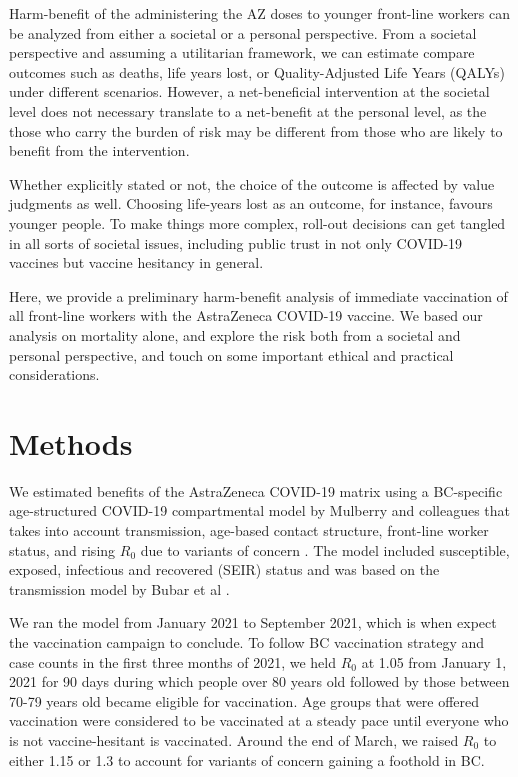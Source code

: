 \documentclass[]{interact}
\theoremstyle{plain}%
\theoremstyle{definition}
\theoremstyle{remark}
\begin{document}
Harm-benefit of the administering the AZ doses to younger front-line
workers can be analyzed from either a societal or a personal
perspective. From a societal perspective and assuming a utilitarian
framework, we can estimate compare outcomes such as deaths, life years
lost, or Quality-Adjusted Life Years (QALYs) under different scenarios.
However, a net-beneficial intervention at the societal level does not
necessary translate to a net-benefit at the personal level, as the those
who carry the burden of risk may be different from those who are likely
to benefit from the intervention.

Whether explicitly stated or not, the choice of the outcome is affected
by value judgments as well. Choosing life-years lost as an outcome, for
instance, favours younger people. To make things more complex, roll-out
decisions can get tangled in all sorts of societal issues, including
public trust in not only COVID-19 vaccines but vaccine hesitancy in
general.

Here, we provide a preliminary harm-benefit analysis of immediate
vaccination of all front-line workers with the AstraZeneca COVID-19
vaccine. We based our analysis on mortality alone, and explore the risk
both from a societal and personal perspective, and touch on some
important ethical and practical considerations.

\hypertarget{methods}{%
\section{Methods}\label{methods}}

We estimated benefits of the AstraZeneca COVID-19 matrix using a
BC-specific age-structured COVID-19 compartmental model by Mulberry and
colleagues that takes into account transmission, age-based contact
structure, front-line worker status, and rising \(R_0\) due to variants
of concern \citep{mulberry_vaccine_2021}. The model included
susceptible, exposed, infectious and recovered (SEIR) status and was
based on the transmission model by Bubar et al
\citep{bubar_model-informed_2021}.

We ran the model from January 2021 to September 2021, which is when
expect the vaccination campaign to conclude. To follow BC vaccination
strategy and case counts in the first three months of 2021, we held
\(R_0\) at 1.05 from January 1, 2021 for 90 days during which people
over 80 years old followed by those between 70-79 years old became
eligible for vaccination. Age groups that were offered vaccination were
considered to be vaccinated at a steady pace until everyone who is not
vaccine-hesitant is vaccinated. Around the end of March, we raised
\(R_0\) to either 1.15 or 1.3 to account for variants of concern gaining
a foothold in BC.
\end{document}
